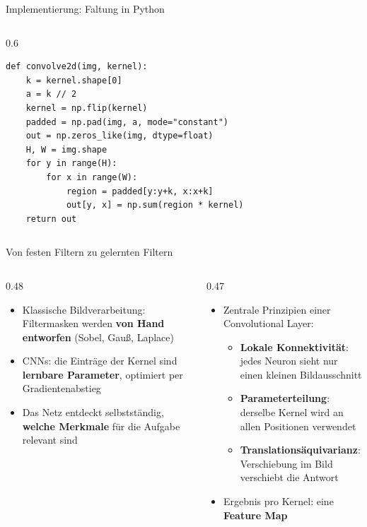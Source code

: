 {\begin{frame}[fragile]{Implementierung: Faltung in Python}
\begin{columns}
\begin{column}{0.6\textwidth}
\begin{verbatim}
def convolve2d(img, kernel):
    k = kernel.shape[0]
    a = k // 2
    kernel = np.flip(kernel)
    padded = np.pad(img, a, mode="constant")
    out = np.zeros_like(img, dtype=float)
    H, W = img.shape
    for y in range(H):
        for x in range(W):
            region = padded[y:y+k, x:x+k]
            out[y, x] = np.sum(region * kernel)
    return out
\end{verbatim}
\end{column}
\end{columns}
\end{frame}


\makequizpage{\QUIZURL}{\QUIZQRCODE}{\QUIZIMAGE}

\begin{frame}{Von festen Filtern zu gelernten Filtern}
\begin{columns}
\begin{column}{0.48\textwidth}
\begin{itemize}
    \item Klassische Bildverarbeitung: Filtermasken werden \textbf{von Hand entworfen} (Sobel, Gauß, Laplace)
    \item CNNs: die Einträge der Kernel sind \textbf{lernbare Parameter}, optimiert per Gradientenabstieg
    \item Das Netz entdeckt selbstständig, \textbf{welche Merkmale} für die Aufgabe relevant sind
\end{itemize}
\end{column}
\begin{column}{0.47\textwidth}
\begin{itemize}
    \item Zentrale Prinzipien einer Convolutional Layer:
    \begin{itemize}
        \item \textbf{Lokale Konnektivität}: jedes Neuron sieht nur einen kleinen Bildausschnitt
        \item \textbf{Parameterteilung}: derselbe Kernel wird an allen Positionen verwendet
        \item \textbf{Translationsäquivarianz}: Verschiebung im Bild verschiebt die Antwort
    \end{itemize}
    \item Ergebnis pro Kernel: eine \textbf{Feature Map}
\end{itemize}
\end{column}
\end{columns}
\end{frame}

}
